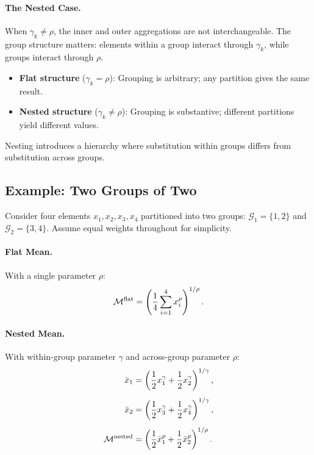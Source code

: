 \paragraph{The Nested Case.}
When $\gamma_k \neq \rho$, the inner and outer aggregations are not interchangeable. The group structure matters: elements within a group interact through $\gamma_k$, while groups interact through $\rho$.

\begin{calloutimportant}
\begin{itemize}[leftmargin=1.5em]
    \item \textbf{Flat structure} ($\gamma_k = \rho$): Grouping is arbitrary; any partition gives the same result.
    \item \textbf{Nested structure} ($\gamma_k \neq \rho$): Grouping is substantive; different partitions yield different values.
\end{itemize}
Nesting introduces a hierarchy where substitution within groups differs from substitution across groups.
\end{calloutimportant}

\subsection{Example: Two Groups of Two}
\label{subsec:example-two-groups}

Consider four elements $x_1, x_2, x_3, x_4$ partitioned into two groups: $\mathcal{G}_1 = \{1, 2\}$ and $\mathcal{G}_2 = \{3, 4\}$. Assume equal weights throughout for simplicity.

\paragraph{Flat Mean.}
With a single parameter $\rho$:
\begin{equation}
\mathcal{M}^{\text{flat}} = \left( \frac{1}{4} \sum_{i=1}^{4} x_i^\rho \right)^{1/\rho}.
\label{eq:flat-four}
\end{equation}

\paragraph{Nested Mean.}
With within-group parameter $\gamma$ and across-group parameter $\rho$:
\begin{align}
\bar{x}_1 &= \left( \frac{1}{2} x_1^\gamma + \frac{1}{2} x_2^\gamma \right)^{1/\gamma}, \label{eq:nested-group1} \\[4pt]
\bar{x}_2 &= \left( \frac{1}{2} x_3^\gamma + \frac{1}{2} x_4^\gamma \right)^{1/\gamma}, \label{eq:nested-group2} \\[4pt]
\mathcal{M}^{\text{nested}} &= \left( \frac{1}{2} \bar{x}_1^\rho + \frac{1}{2} \bar{x}_2^\rho \right)^{1/\rho}. \label{eq:nested-outer}
\end{align}

